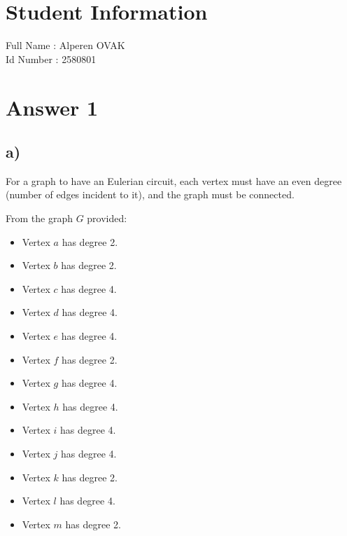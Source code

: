 \documentclass[12pt]{article}
\begin{document}
\section*{Student Information } 
Full Name :  Alperen OVAK\\
Id Number :  2580801\\

\section*{Answer 1}



\subsection*{a)}

For a graph to have an Eulerian circuit, each vertex must have an even degree (number of edges incident to it), and the graph must be connected.

From the graph \( G \) provided:

\begin{itemize}
    \item Vertex \( a \) has degree 2.
    \item Vertex \( b \) has degree 2.
    \item Vertex \( c \) has degree 4.
    \item Vertex \( d \) has degree 4.
    \item Vertex \( e \) has degree 4.
    \item Vertex \( f \) has degree 2.
    \item Vertex \( g \) has degree 4.
    \item Vertex \( h \) has degree 4.
    \item Vertex \( i \) has degree 4.
    \item Vertex \( j \) has degree 4.
    \item Vertex \( k \) has degree 2.
    \item Vertex \( l \) has degree 4.
    \item Vertex \( m \) has degree 2.
\end{itemize}
\end{document}
